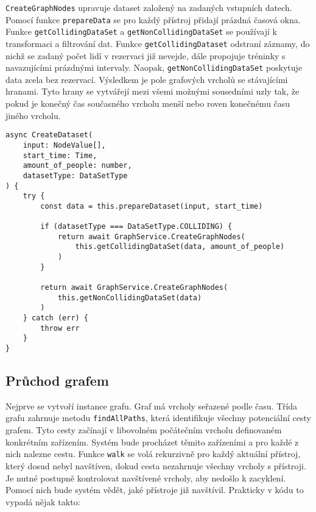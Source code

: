 \texttt{CreateGraphNodes} upravuje dataset založený na zadaných vstupních datech. Pomocí funkce \texttt{prepareData} se pro každý přístroj přidají prázdná časová okna. Funkce \texttt{getCollidingDataSet} a \texttt{getNonCollidingDataSet} se používají k transformaci a filtrování dat. Funkce \texttt{getCollidingDataset} odstraní záznamy, do nichž se zadaný počet lidí v rezervaci již nevejde, dále propojuje tréninky s navazujícími prázdnými intervaly. Naopak, \texttt{getNonCollidingDataSet} poskytuje data zcela bez rezervací. Výsledkem je pole grafových vrcholů se stávajícími hranami. Tyto hrany se vytvářejí mezi všemi možnými sousedními uzly tak, že pokud je konečný čas současného vrcholu menší nebo roven konečnému času jiného vrcholu.

\begin{lstlisting}
async CreateDataset(
    input: NodeValue[],
    start_time: Time,
    amount_of_people: number,
    datasetType: DataSetType
) {
    try {
	    const data = this.prepareDataset(input, start_time)

	    if (datasetType === DataSetType.COLLIDING) {
		    return await GraphService.CreateGraphNodes(
			    this.getCollidingDataSet(data, amount_of_people)
		    )
	    }

	    return await GraphService.CreateGraphNodes(
		    this.getNonCollidingDataSet(data)
	    )
    } catch (err) {
	    throw err
    }
}
\end{lstlisting}

\subsection{Průchod grafem}

Nejprve se vytvoří instance grafu. Graf má vrcholy seřazené podle času. Třída grafu zahrnuje metodu \texttt{findAllPaths}, která identifikuje všechny potenciální cesty grafem. Tyto cesty začínají v libovolném počátečním vrcholu definovaném konkrétním zařízením. Systém bude procházet těmito zařízeními a pro každé z nich nalezne cestu. Funkce \texttt{walk} se volá rekurzivně pro každý aktuální přístroj, který dosud nebyl navštíven, dokud cesta nezahrnuje všechny vrcholy s přístroji. Je nutné postupně kontrolovat navštívené vrcholy, aby nedošlo k zacyklení. Pomocí nich bude systém vědět, jaké přístroje již navštívil. Prakticky v kódu to vypadá nějak takto:

